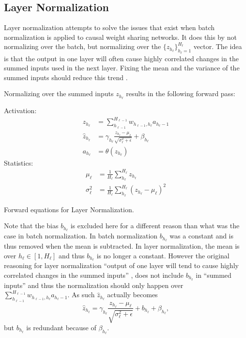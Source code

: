 \clearpage
\subsection{Layer Normalization}

Layer normalization attempts to solve the issues that exist when batch normalization is applied to causal weight sharing networks. It does this by not normalizing over the batch, but normalizing over the $\{z_{h_\ell}\}_{h_\ell=1}^{H_\ell}$ vector. The idea is that the output in one layer will often cause highly correlated changes in the summed inputs used in the next layer. Fixing the mean and the variance of the summed inputs should reduce this trend \cite{layer-normalization}.

Normalizing over the summed inputs $z_{h_\ell}$ results in the following forward pass:
\begin{equationbox}[H]
Activation:
\begin{equation*}
\begin{aligned}
z_{h_\ell} &= \sum_{h_{\ell-1}}^{H_{\ell-1}} w_{h_{\ell-1},h_\ell} a_{h_\ell-1} \\
\hat{z}_{h_\ell} &= \gamma_{h_\ell} \frac{z_{h_\ell} - \mu_{\ell}}{\sqrt{\sigma_{\ell}^2 + \epsilon}} + \beta_{h_\ell} \\
a_{h_\ell} &= \theta\left(z_{h_\ell}\right)
\end{aligned}
\end{equation*}
Statistics:
\begin{equation*}
\begin{aligned}
\mu_{\ell} &= \frac{1}{H_\ell} \sum_{h_\ell}^{H_\ell} z_{h_\ell} \\
\sigma_{\ell}^2 &= \frac{1}{H_\ell} \sum_{h_\ell}^{H_\ell} (z_{h_\ell} - \mu_{\ell})^2
\end{aligned}
\end{equation*}
\caption{Forward equations for Layer Normalization.}
\end{equationbox}

Note that the bias $b_{h_\ell}$ is excluded here for a different reason than what was the case in batch normalization. In batch normalization $b_{h_\ell}$ was a constant and is thus removed when the mean is subtracted. In layer normalization, the mean is over $h_\ell \in [1, H_\ell]$ and thus $b_{h_\ell}$ is no longer a constant. However the original reasoning for layer normalization ``output of one layer will tend to cause highly correlated changes in the summed inputs'' \cite{layer-normalization}, does not include $b_{h_\ell}$ in ``summed inputs'' and thus the normalization should only happen over $\sum_{h_{\ell-1}}^{H_{\ell-1}} w_{h_{\ell-1},h_\ell} a_{h_\ell-1}$. As such $\hat{z}_{h_\ell}$ actually becomes
\begin{equation*}
\hat{z}_{h_\ell} = \gamma_{h_\ell} \frac{z_{h_\ell} - \mu_{\ell}}{\sqrt{\sigma_{\ell}^2 + \epsilon}} + b_{h_\ell} + \beta_{h_\ell},
\end{equation*}
but $b_{h_\ell}$ is redundant because of $\beta_{h_\ell}$.

